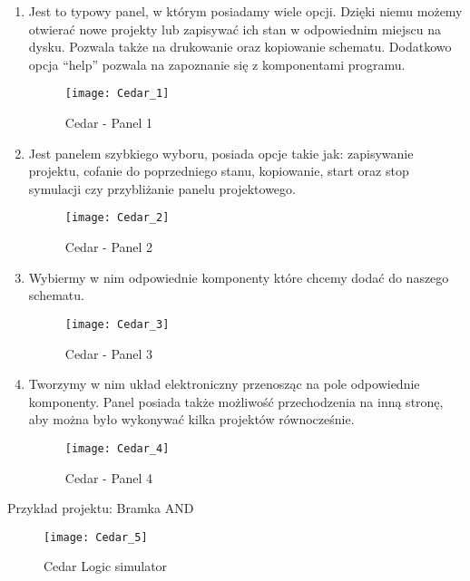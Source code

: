 \documentclass[12pt, a4paper, onside, polish]{article}				%
\begin{document}
 \begin{enumerate}
\item  Jest to typowy panel, w którym posiadamy wiele opcji. Dzięki niemu możemy otwierać nowe projekty lub zapisywać ich stan w odpowiednim miejscu na dysku. Pozwala także na drukowanie oraz kopiowanie schematu. Dodatkowo opcja “help” pozwala na zapoznanie się z komponentami programu. 
  	\begin{figure}[hbt!]
  	  {\centering \texttt{[image: Cedar\_1]} \caption{Cedar - Panel 1}}\vspace{5mm}
  	  \end{figure}
  	  
\item  Jest panelem szybkiego wyboru, posiada opcje takie jak: zapisywanie projektu, cofanie do poprzedniego stanu, kopiowanie, start oraz stop symulacji czy przybliżanie panelu projektowego.
  	\begin{figure}[hbt!]
  	  {\centering \texttt{[image: Cedar\_2]} \caption{Cedar - Panel 2}}\vspace{5mm}
  	  \end{figure}
  	  
  	  \item  Wybiermy w nim odpowiednie komponenty które chcemy dodać do naszego schematu. 
  	\begin{figure}[hbt!]
  	  {\centering \texttt{[image: Cedar\_3]} \caption{Cedar - Panel 3}}\vspace{5mm}
  	  \end{figure}
  	  
  	  
  	  \item  Tworzymy w nim układ elektroniczny przenosząc na pole odpowiednie komponenty. Panel posiada także możliwość przechodzenia na inną stronę, aby można było wykonywać kilka projektów równocześnie. 
  	\begin{figure}[hbt!]
  	  {\centering \texttt{[image: Cedar\_4]} \caption{Cedar - Panel 4}}\vspace{5mm}
  	  \end{figure}
\end{enumerate}
Przykład projektu: Bramka AND
\begin{figure}[hbt!]
{\centering \texttt{[image: Cedar\_5]} \caption{Cedar Logic simulator}}\vspace{5mm}
\end{figure}
\end{document}
